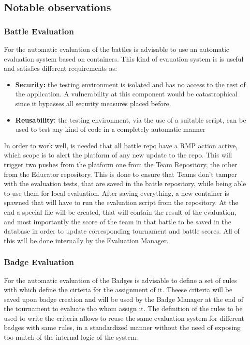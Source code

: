 \subsection{Notable observations}
\subsubsection{Battle Evaluation}
For the automatic evaluation of the battles is advisable to use an automatic evaluation system based on containers.
This kind of evauation system is is useful and satisfies different requirements as:
\begin{itemize}
    \item \textbf{Security:} the testing environment is isolated and has no access to the rest of the application. A vulnerability at this component would be catastrophical since it bypasses all security measures placed before.
    \item \textbf{Reusability:} the testing environment, via the use of a suitable script, can be used to test any kind of code in a completely automatic manner
\end{itemize}
In order to work well, is needed that all battle repo have a RMP action active, which scope is to alert the platform of any new update to the repo. This will trigger two pushes from the platform one from the Team Repository, the other from the Educator repository. 
This is done to ensure that Teams don't tamper with the evaluation tests, that are saved in the battle repository, while being able to use them for local evaluation. 
After saving everything, a new container is spawned that will have to run the evaluation script from the repository. 
At the end a special file will be created, that will contain the result of the evaluation, and most importantly the score of the team in that battle to be saved in the database in order to update corresponding tournament and battle scores.
All of this will be done internally by the Evaluation Manager.
\subsubsection{Badge Evaluation}
For the automatic evaluation of the Badges is advisable to define a set of rules with which define the cirteria for the assignment of it.
Theese criteria will be saved upon badge creation and will be used by the Badge Manager at the end of the tournament to evaluate tho whom assign it.
The definition of the rules to be used to write the criteria allows to reuse the same evaluation system for different badges with same rules, in a standardized manner without the need of exposing too mutch of the internal logic of the system.

